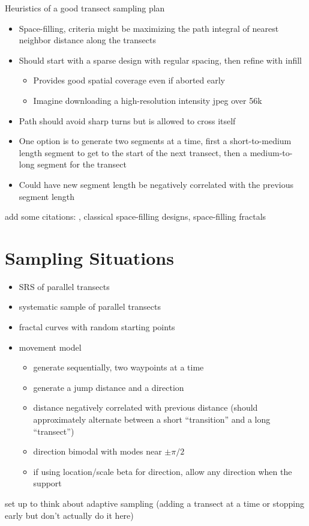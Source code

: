 \documentclass[12pt]{article}
\begin{document}
Heuristics of a good transect sampling plan
\begin{itemize}
\item Space-filling, criteria might be maximizing the path integral of nearest
neighbor distance along the transects
\item Should start with a sparse design with regular spacing, then refine with
infill
\begin{itemize}
\item Provides good spatial coverage even if aborted early
\item Imagine downloading a high-resolution intensity jpeg over 56k
\end{itemize}
\item Path should avoid sharp turns but is allowed to cross itself
\item One option is to generate two segments at a time, first a short-to-medium
length segment to get to the start of the next transect, then a  medium-to-long
segment for the transect
\item Could have new segment length be negatively correlated with the previous
segment length
\end{itemize}

add some citations: \cite{lark}, classical space-filling designs,
space-filling fractals


\section{Sampling Situations}

\begin{itemize}

\item SRS of parallel transects

\item systematic sample of parallel transects

\item fractal curves with random starting points

\item movement model
\begin{itemize}
\item generate sequentially, two waypoints at a time
\item generate a jump distance and a direction
\item distance negatively correlated with previous distance (should
approximately alternate between a short ``transition'' and a long ``transect'')
\item direction bimodal with modes near \(\pm \pi / 2\)
\item if using location/scale beta for direction, allow any direction when the
support 
\end{itemize}

\end{itemize}

set up to think about adaptive sampling (adding a transect at a time or
stopping early but don't actually do it here)




\end{document}
